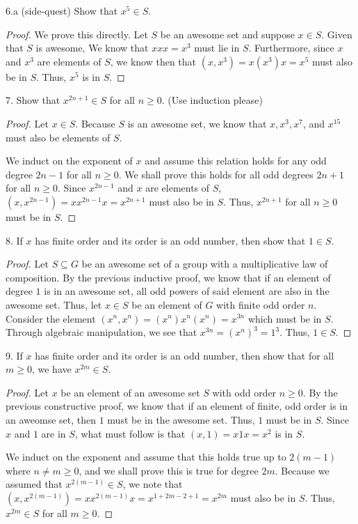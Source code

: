 \documentclass[a4paper,12pt]{article}
\begin{document}
6.a (side-quest) Show that $x^5 \in S$.
\begin{proof}
    We prove this directly. Let $S$ be an awesome set and suppose $x \in S$. Given that $S$ is awesome, We know that $x x x = x^3$ must lie in $S$. Furthermore, since $x$ and $x^3$ are elements of $S$, we know then that $(x, x^3) = x (x^3) x = x^5$ must also be in $S$. Thus, $x^5$ is in $S$.
\end{proof}

7. Show that $x^{2n+1} \in S$ for all $n \geq 0$.  (Use induction please)

\begin{proof}
   Let $x \in S$. Because $S$ is an awesome set, we know that $x, x^3, x^7$, and $x^{15}$ must also be elements of $S$. 

   We induct on the exponent of $x$ and assume this relation holds for any odd degree $2n-1$ for all $n \geq 0$. We shall prove this holds for all odd degrees $2n +1$ for all $n \geq 0$. Since  $x^{2n-1}$ and $x$ are elements of $S$, $(x, x^{2n-1}) = x x^{2n-1} x = x^{2n+1}$ must also be in $S$. Thus, $x^{2n+1}$ for all $n \geq 0$ must be in $S$.
   
\end{proof}

8. If $x$ has finite order and its order is an odd number, then show that $1 \in S$.

\begin{proof}
    Let $S \subseteq G$ be an awesome set of a group with a multiplicative law of composition. By the previous inductive proof, we know that if an element of degree $1$ is in an awesome set, all odd powers of said element are also in the awesome set. Thus, let $x \in S$ be an element of $G$ with finite odd order $n$. Consider the element $(x^{n}, x^{n}) = (x^{n})x^{n}(x^{n}) = x^{3n}$ which must be in $S$. Through algebraic manipulation, we see that $x^{3n}= (x^{n})^3 = 1^3.$ Thus, $1 \in S$.
\end{proof}

9. If $x$ has finite order and its order is an odd number, then show that for all $m \geq 0$, we have $x^{2m} \in S$.

\begin{proof}
    Let $x$ be an element of an awesome set $S$ with odd order $n \geq 0$. By the previous constructive proof, we know that if an element of finite, odd order is in an aweomse set, then $1$ must be in the awesome set. Thus, $1$ must be in $S$. Since $x$ and $1$ are in $S$, what must follow is that $(x, 1) = x 1 x = x^2$ is in $S$. 

    We induct on the exponent and assume that this holds true up to $2(m-1)$ where $n \neq m \geq 0$, and we shall prove this is true for degree $2m$. Because we assumed that $x^{2(m-1)} \in S$, we note that $(x, x^{2(m-1)}) = x x^{2(m-1)} x = x^{1 + 2m -2 +1} = x^{2m}$ must also be in $S$. Thus, $x^{2m} \in S$ for all $m \geq 0$.
\end{proof}
     
\end{document}
